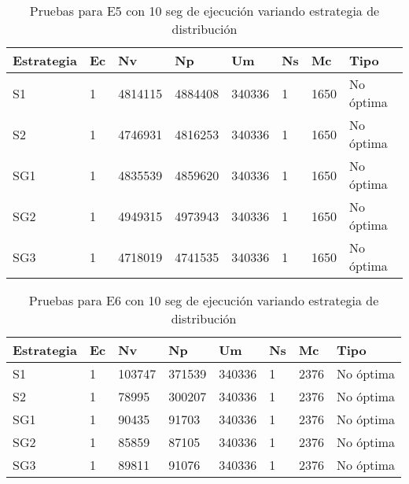 \begin{center}
\begin{longtable}{|p{3cm}|p{1.0cm}|p{1.6cm}|p{1.6cm}|p{1.1cm}|p{1.1cm}|p{1.1cm}|p{2.7cm}|}
	\caption{Pruebas para E5 con 10 seg de ejecución variando estrategia de distribución} \\
	\hline
	\cellcolor[gray]{0.9} \textbf{Estrategia} & \cellcolor[gray]{0.9}\textbf{Ec} & \cellcolor[gray]{0.9}\textbf{Nv} & \cellcolor[gray]{0.9}\textbf{Np} & \cellcolor[gray]{0.9}\textbf{Um} & \cellcolor[gray]{0.9}\textbf{Ns} &  \cellcolor[gray]{0.9}\textbf{Mc} & \cellcolor[gray]{0.9}\textbf{Tipo}\\	\hline
	S1& 1 &4814115  &4884408 &340336  &1 &1650&No óptima \\
	\hline
	S2& 1 &4746931  &4816253 &340336  &1 &1650&No óptima \\
	\hline
	SG1& 1 &4835539  &4859620 &340336  &1 &1650&No óptima \\
	\hline
	SG2& 1 &4949315  &4973943 &340336  &1 &1650&No óptima \\
	\hline
	SG3& 1 &4718019  &4741535 &340336  &1 &1650&No óptima \\
	\hline
\end{longtable}	
\end{center}


\begin{center}
\begin{longtable}{|p{3cm}|p{1.0cm}|p{1.6cm}|p{1.6cm}|p{1.1cm}|p{1.1cm}|p{1.1cm}|p{2.7cm}|}
	\caption{Pruebas para E6 con 10 seg de ejecución variando estrategia de distribución} \\
	\hline
	\cellcolor[gray]{0.9} \textbf{Estrategia} & \cellcolor[gray]{0.9}\textbf{Ec} & \cellcolor[gray]{0.9}\textbf{Nv} & \cellcolor[gray]{0.9}\textbf{Np} & \cellcolor[gray]{0.9}\textbf{Um} & \cellcolor[gray]{0.9}\textbf{Ns} &  \cellcolor[gray]{0.9}\textbf{Mc} & \cellcolor[gray]{0.9}\textbf{Tipo}\\	\hline
	S1& 1 &103747  &371539 &340336  &1 &2376&No óptima \\
	\hline
	S2& 1 &78995  &300207 &340336  &1 &2376&No óptima \\
	\hline
	SG1& 1 &90435  &91703 &340336  &1 &2376&No óptima \\
	\hline
	SG2& 1 &85859  &87105 &340336  &1 &2376&No óptima \\
	\hline
	SG3& 1 &89811  &91076 &340336  &1 &2376&No óptima \\
	\hline
\end{longtable}	
\end{center}

